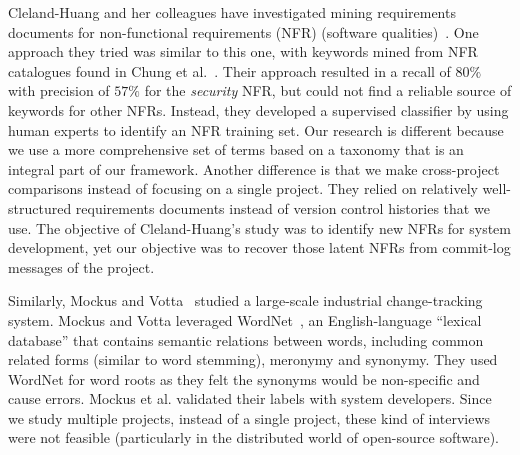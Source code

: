 \documentclass[smallextended]{svjour3}       %
\begin{document}
Cleland-Huang and her colleagues have investigated mining requirements
documents for non-functional requirements (NFR) (software
qualities)~\cite{Cleland-Huang2006}.  
One approach they tried was similar to this one, with keywords mined from NFR catalogues found in Chung et al.~\cite{corollary99}. 
Their approach resulted in a recall of $80\%$ with precision of $57\%$ for the \emph{security} NFR, but could not find a reliable source of keywords for other NFRs. 
Instead, they developed a supervised classifier by using human experts to identify an NFR training set. 
Our research is different because we use a more comprehensive set of terms based on a taxonomy that is an integral part of our framework.
Another difference is that we make cross-project comparisons instead of focusing
on a single project.
They relied on relatively well-structured requirements documents instead of version control histories that we use.
The objective of Cleland-Huang's study was to identify new NFRs for system development, 
yet our objective was to recover those latent NFRs from commit-log messages of the project. 


Similarly, Mockus and Votta~\cite{Mockus00} studied a large-scale industrial change-tracking system. 
Mockus and Votta leveraged WordNet~\cite{Fellbaum1998}, an English-language ``lexical database'' that contains semantic relations between words,
including common related forms (similar to word stemming), meronymy and synonymy.
They used WordNet for word roots as they felt the synonyms would be
non-specific and cause errors.
Mockus et al. validated their labels with system developers.
Since we study multiple projects, instead of a single project, these
kind of interviews were not feasible (particularly in the distributed world of open-source software).
\end{document}
